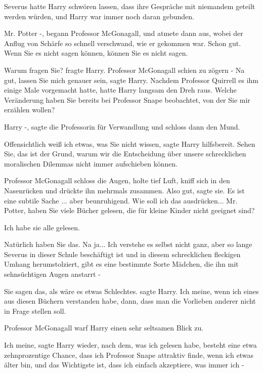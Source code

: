 Severus hatte Harry schwören lassen, dass ihre Gespräche mit niemandem geteilt
werden würden, und Harry war immer noch daran gebunden.

\glqq{}Mr. Potter -\grqq{}, begann Professor McGonagall, und atmete dann aus,
wobei der Anflug von Schärfe so schnell verschwand, wie er gekommen war. \glqq{}
Schon gut. Wenn Sie es nicht sagen können, können Sie es nicht sagen.\grqq{}

\glqq{}Warum fragen Sie?\grqq{} fragte Harry. Professor McGonagall schien zu
zögern - \glqq{}Na gut, lassen Sie mich genauer sein\grqq{}, sagte Harry. Nachdem
Professor Quirrell es ihm einige Male vorgemacht hatte, hatte Harry langsam den
Dreh raus. \glqq{}Welche Veränderung haben Sie bereits bei Professor Snape
beobachtet, von der Sie mir erzählen wollen?\grqq{}

\glqq{}Harry -\grqq{}, sagte die Professorin für Verwandlung und schloss dann den
Mund.

\glqq{}Offensichtlich weiß ich etwas, was Sie nicht wissen\grqq{}, sagte Harry
hilfsbereit. \glqq{}Sehen Sie, das ist der Grund, warum wir die Entscheidung über
unsere schrecklichen moralischen Dilemmas nicht immer aufschieben können.\grqq{}

Professor McGonagall schloss die Augen, holte tief Luft, kniff sich in den
Nasenrücken und drückte ihn mehrmals zusammen. \glqq{}Also gut\grqq{}, sagte sie.
\glqq{}Es ist eine subtile Sache ... aber beunruhigend. Wie soll ich das
ausdrücken... Mr. Potter, haben Sie viele Bücher gelesen, die für kleine Kinder
nicht geeignet sind?\grqq{}

\glqq{}Ich habe sie alle gelesen.\grqq{}

\glqq{}Natürlich haben Sie das. Na ja... Ich verstehe es selbst nicht ganz, aber
so lange Severus in dieser Schule beschäftigt ist und in diesem schrecklichen
fleckigen Umhang herumstolziert, gibt es eine bestimmte Sorte Mädchen, die ihn
mit sehnsüchtigen Augen anstarrt -\grqq{}

\glqq{}Sie sagen das, als wäre es etwas Schlechtes.\grqq{} sagte Harry. \glqq{}Ich
meine, wenn ich eines aus diesen Büchern verstanden habe, dann, dass man die
Vorlieben anderer nicht in Frage stellen soll.\grqq{}

Professor McGonagall warf Harry einen sehr seltsamen Blick zu.

\glqq{}Ich meine\grqq{}, sagte Harry wieder, \glqq{}nach dem, was ich gelesen
habe, besteht eine etwa zehnprozentige Chance, dass ich Professor Snape
attraktiv finde, wenn ich etwas älter bin, und das Wichtigste ist, dass ich
einfach akzeptiere, was immer ich -\grqq{}

